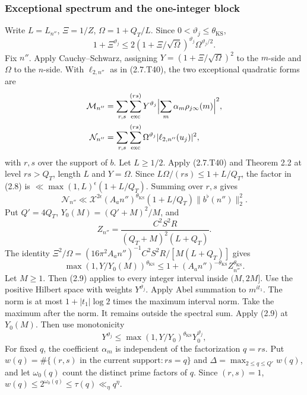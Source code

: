 \subsubsection{Exceptional spectrum and the one-integer block}\label{p1:sec:t-exceptional}

Write $L=L_{n''}$, $\Xi=1/Z$, $\Omega=1+Q_T/L$.
Since $0<\vartheta_j\le\theta_{\mathrm{KS}}$,
\[
1+\Xi^{\vartheta_j}
 \le2(1+\Xi/\sqrt{\Omega})^{\vartheta_j}\Omega^{\vartheta_j/2}.
\tag{2.7.T48}\label{p1:eq:2.7.T48}
\]
Fix $n''$. Apply Cauchy--Schwarz, assigning
$Y=(1+\Xi/\sqrt{\Omega})^2$ to the $m$-side and
$\Omega$ to the $n$-side. With $\ell_{2,n''}$ as in (2.7.T40), the two exceptional quadratic forms are
\[
\begin{aligned}
\mathcal M_{n''}&=\sum_{r,s}\sum_{\rm exc}^{(rs)}Y^{\vartheta_j}
 \Bigl|\sum_m\alpha_m\rho_{j\infty}(m)\Bigr|^2,\\
\mathcal N_{n''}&=\sum_{r,s}\sum_{\rm exc}^{(rs)}\Omega^{\vartheta_j}
 |\ell_{2,n''}(u_j)|^2,
\end{aligned}
\]
with $r,s$ over the support of $b$. Let $L\ge1/2$. Apply (2.7.T40) and Theorem 2.2 at level $rs>Q_T$, length $L$ and $Y=\Omega$. Since $L\Omega/(rs)\le1+L/Q_T$, the factor in (2.8) is $\ll\max(1,L)^\epsilon(1+L/Q_T)$. Summing over $r,s$ gives
\[
\mathcal N_{n''}\ll\mathcal X^{2\epsilon}(A_an'')^{\theta_{\mathrm{KS}}}
                 (1+L/Q_T)\|b^\flat(n'')\|_2^2.
\tag{2.7.T49}\label{p1:eq:2.7.T49}
\]
Put $Q'=4Q_T$, $Y_0(M)=(Q'+M)^2/M$, and
\[
Z_{n''}=\frac{C^2S^2R}{(Q_T+M)^2(L+Q_T)}.
\tag{2.7.T50}\label{p1:eq:2.7.T50}
\]
The identity
$\Xi^2/\Omega=(16\pi^2A_an'')^{-1}
C^2S^2R/[M(L+Q_T)]$ gives
\[
\max(1,Y/Y_0(M))^{\theta_{\mathrm{KS}}}
 \le1+(A_an'')^{-\theta_{\mathrm{KS}}}Z_{n''}^{\theta_{\mathrm{KS}}}.
\tag{2.7.T51}\label{p1:eq:2.7.T51}
\]
Let $M\ge1$. Then (2.9) applies to every integer interval
inside $(M,2M]$. Use the positive Hilbert space with weights $Y^{\vartheta_j}$. Apply Abel summation to $m^{it_1}$. The norm is at most $1+|t_1|\log2$ times the maximum interval norm. Take the maximum after the norm. It remains outside the spectral sum. Apply (2.9) at $Y_0(M)$. Then use monotonicity
\[
Y^{\vartheta_j}\le\max(1,Y/Y_0)^{\theta_{\mathrm{KS}}} Y_0^{\vartheta_j},
\tag{2.7.T52}\label{p1:eq:2.7.T52}
\]
For fixed $q$, the coefficient $\alpha_m$ is independent of the
factorization $q=rs$. Put
$w(q)=\#\{(r,s)\text{ in the current support}:rs=q\}$ and
$\Delta=\max_{2\le q\le Q'}w(q)$, and let $\omega_0(q)$
count the distinct prime factors of $q$. Since $(r,s)=1$,
$w(q)\le2^{\omega_0(q)}\le\tau(q)\ll_\eta q^\eta$.
